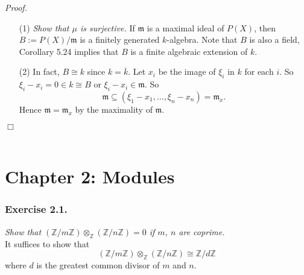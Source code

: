 \documentclass{article}
\begin{document}
\emph{Proof.}
\begin{enumerate}
\item[(1)]
  \emph{Show that $\mu$ is surjective.}
  If $\mathfrak{m}$ is a maximal ideal of $P(X)$,
  then $B := P(X)/\mathfrak{m}$ is a finitely generated $k$-algebra.
  Note that $B$ is also a field,
  Corollary 5.24 implies that $B$ is a finite algebraic extension of $k$.

\item[(2)]
  In fact, $B \cong k$ since $k = \overline{k}$.
  Let $x_i$ be the image of $\xi_i$ in $k$ for each $i$.
  So $\xi_i - x_i = 0 \in k \cong B$ or $\xi_i - x_i \in \mathfrak{m}$.
  So
  \[
    \mathfrak{m} \subseteq (\xi_1 - x_1, \ldots, \xi_n - x_n) = \mathfrak{m}_x.
  \]
  Hence $\mathfrak{m} = \mathfrak{m}_x$ by the maximality of $\mathfrak{m}$.
\end{enumerate}
$\Box$ \\\\









\newpage
\section*{Chapter 2: Modules \\}



\subsubsection*{Exercise 2.1.}
\emph{Show that
$(\mathbb{Z}/m\mathbb{Z}) \otimes_{\mathbb{Z}} (\mathbb{Z}/n\mathbb{Z}) = 0$
if $m$, $n$ are coprime.} \\

It suffices to show that
$$(\mathbb{Z}/m\mathbb{Z}) \otimes_{\mathbb{Z}} (\mathbb{Z}/n\mathbb{Z})
\cong \mathbb{Z}/d\mathbb{Z}$$
where $d$ is the greatest common divisor of $m$ and $n$. \\
\end{document}
